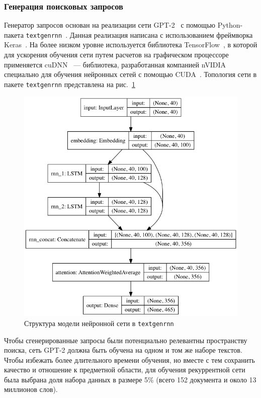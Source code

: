 \subsubsection{Генерация поисковых запросов}
Генератор запросов основан на реализации сети GPT-2~\cite{radford2019language} с помощью Python-пакета \texttt{textgenrnn}~\cite{TextgenRNN2020}. 
Данная реализация написана с использованием фреймворка Keras~\cite{chollet2015keras}. На более низком уровне используется
библиотека TensorFlow~\cite{tensorflow2015-whitepaper}, в которой для ускорения обучения сети путем расчетов на графическом процессоре
применяется cuDNN~\cite{DBLP:journals/corr/ChetlurWVCTCS14} --- библиотека, разработанная компанией nVIDIA специально для 
обучения нейронных сетей с помощью CUDA~\cite{cuda}. Топология сети в пакете \texttt{textgenrnn} представлена на рис.~\ref{fig:default}

\begin{figure}
    \centerline{\includegraphics[scale=0.5]{default_model.png}}
    \caption{Структура модели нейронной сети в \texttt{textgenrnn}}\label{fig:default}
\end{figure}

Чтобы сгенерированные запросы были потенциально релевантны пространству поиска, сеть GPT-2 должна быть обучена на одном и том же
наборе текстов. Чтобы избежать более длительного времени обучения, но вместе с тем сохранить качество и отношение к предметной области,
для обучения рекуррентной сети была выбрана доля набора данных в размере 5\% (всего 152 документа и около 13 миллионов слов).

